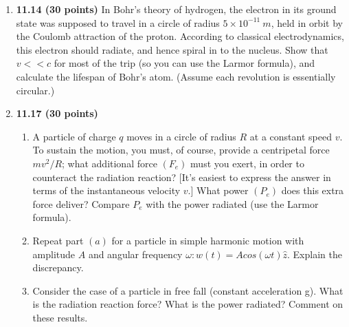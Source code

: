 \documentclass[fleqn]{article}
\begin{document}
  \begin{enumerate}
    \item \textbf{11.14 (30 points)} In Bohr's theory of hydrogen, the electron in its ground state was
    supposed to travel in a circle of radius $5 \times 10^{-11} ~ m$, held in orbit by the Coulomb
    attraction of the proton. According to classical electrodynamics, this electron should
    radiate, and hence spiral in to the nucleus. Show that $v<<c$ for most of the trip
    (so you can use the Larmor formula), and calculate the lifespan of Bohr's atom.
    (Assume each revolution is essentially circular.)


    \item \textbf{11.17 (30 points)} 
    \begin{enumerate}
      \item A particle of charge $q$ moves in a circle of radius $R$ at a constant speed $v$. To sustain the motion, 
      you must, of course, provide a centripetal force $m v^2/R$; what additional force $(F_e)$ must you exert, 
      in order to counteract the radiation reaction? [It's easiest to express the answer in terms of the instantaneous
      velocity $v$.] What power $(P_e)$ does this extra force deliver? Compare $P_e$ with the
      power radiated (use the Larmor formula).

      \item Repeat part $(a)$ for a particle in simple harmonic motion with amplitude $A$ and
      angular frequency $\omega: w(t) = A cos(\omega t) \hat{z}$. Explain the discrepancy.


      \item Consider the case of a particle in free fall (constant acceleration g). What is
      the radiation reaction force? What is the power radiated? Comment on these
      results.


    \end{enumerate}


\end{enumerate}
\end{document}
